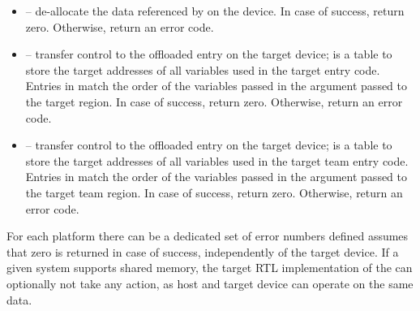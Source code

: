 \begin{itemize}
  \item {} – de-allocate the data referenced by  on the device. In case of success, return zero. Otherwise, return an error code.

  \item {} – transfer control to the offloaded entry on the target device;  is a table to store the target addresses of all variables used in the target entry code. Entries in  match the order of the variables passed in the  argument passed to the target region. In case of success, return zero. Otherwise, return an error code.

  \item {} – transfer control to the offloaded entry on the target device;  is a table to store the target addresses of all variables used in the target team entry code. Entries in  match the order of the variables passed in the  argument passed to the target team region. In case of success, return zero. Otherwise, return an error code.

\end{itemize}

For each platform there can be a dedicated set of error numbers defined \libomptarget{} assumes that zero is returned in case of success, independently of the target device. If a given system supports shared memory, the target RTL implementation of the  can optionally not take any action, as host and target device can operate on the same data.

